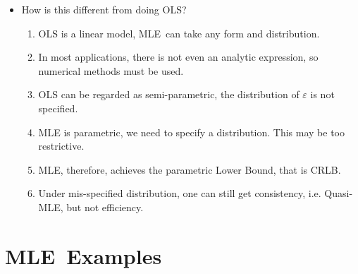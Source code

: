 \documentclass[notes=show]{beamer}
\begin{document}
\begin{frame}%


\begin{itemize}
\item How is this different from doing OLS?

\begin{enumerate}
\item OLS is a linear model, MLE\ can take any form and distribution.

\item In most applications, there is not even an analytic expression, so
numerical methods must be used.

\item OLS can be regarded as semi-parametric, the distribution of $%
\varepsilon $ is not specified.

\item MLE is parametric, we need to specify a distribution. This may be too
restrictive.

\item MLE, therefore, achieves the parametric Lower Bound, that is CRLB.

\item Under mis-specified distribution, one can still get consistency, i.e.
Quasi-MLE, but not efficiency.
\end{enumerate}
\end{itemize}

\end{frame}%

\section{MLE\ Examples}
\end{document}
